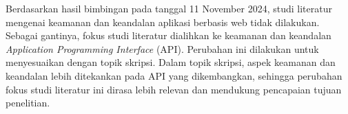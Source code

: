 Berdasarkan hasil bimbingan pada tanggal 11 November 2024, studi literatur mengenai keamanan dan keandalan aplikasi berbasis web tidak dilakukan. Sebagai gantinya, fokus studi literatur dialihkan ke keamanan dan keandalan \textit{Application Programming Interface} (API). Perubahan ini dilakukan untuk menyesuaikan dengan topik skripsi. Dalam topik skripsi, aspek keamanan dan keandalan lebih ditekankan pada API yang dikembangkan, sehingga perubahan fokus studi literatur ini dirasa lebih relevan dan mendukung pencapaian tujuan penelitian.